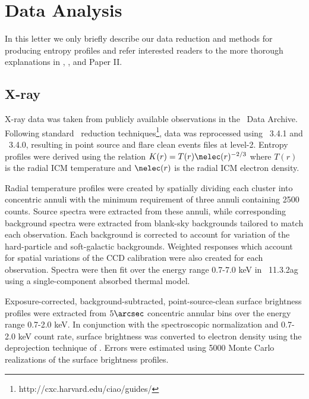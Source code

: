 \documentclass{emulateapj}
\begin{document}
\section{Data Analysis}
\label{sec:data}

In this letter we only briefly describe our data reduction and methods
for producing entropy profiles and refer interested readers to the
more thorough explanations in \cite{dhc06}, \cite{xrayband}, and Paper
II.

\subsection{X-ray}
\label{sec:xray}

X-ray data was taken from publicly available observations in the
\Chandra\ Data Archive. Following standard \Ciao\ reduction
techniques\footnote{http://cxc.harvard.edu/ciao/guides/}, data was
reprocessed using \Ciao\ 3.4.1 and \Caldb\ 3.4.0, resulting in point
source and flare clean events files at level-2. Entropy profiles were
derived using the relation $K(r) = T(r) \nelec(r)^{-2/3}$ where $T(r)$
is the radial ICM temperature and $\nelec(r)$ is the radial ICM
electron density.

Radial temperature profiles were created by spatially dividing each
cluster into concentric annuli with the minimum requirement of three
annuli containing 2500 counts. Source spectra were extracted from
these annuli, while corresponding background spectra were extracted
from blank-sky backgrounds tailored to match each observation.  Each
background is corrected to account for variation of the hard-particle
and soft-galactic backgrounds. Weighted responses which account for
spatial variations of the CCD calibration were also created for each
observation. Spectra were then fit over the energy range 0.7-7.0 keV
in \xspec\ 11.3.2ag \citep{xspec} using a single-component absorbed
thermal model.

Exposure-corrected, background-subtracted, point-source-clean surface
brightness profiles were extracted from $5\arcsec$ concentric annular
bins over the energy range 0.7-2.0 keV. In conjunction with the
spectroscopic normalization and 0.7-2.0 keV count rate, surface
brightness was converted to electron density using the deprojection
technique of \cite{kriss83}. Errors were estimated using 5000 Monte
Carlo realizations of the surface brightness profiles.
\end{document}
